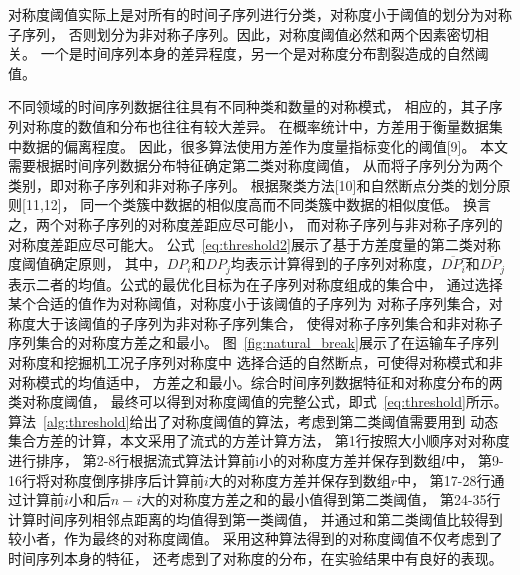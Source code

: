 对称度阈值实际上是对所有的时间子序列进行分类，对称度小于阈值的划分为对称子序列，
否则划分为非对称子序列。因此，对称度阈值必然和两个因素密切相关。
一个是时间序列本身的差异程度，另一个是对称度分布割裂造成的自然阈值。

不同领域的时间序列数据往往具有不同种类和数量的对称模式，
相应的，其子序列对称度的数值和分布也往往有较大差异。
在概率统计中，方差用于衡量数据集中数据的偏离程度。
因此，很多算法使用方差作为度量指标变化的阈值[9]。
本文需要根据时间序列数据分布特征确定第二类对称度阈值，
从而将子序列分为两个类别，即对称子序列和非对称子序列。
根据聚类方法[10]和自然断点分类的划分原则[11,12]，
同一个类簇中数据的相似度高而不同类簇中数据的相似度低。
换言之，两个对称子序列的对称度差距应尽可能小，
而对称子序列与非对称子序列的对称度差距应尽可能大。
公式~\ref{eq:threshold2}展示了基于方差度量的第二类对称度阈值确定原则，
其中，$DP_i$和$DP_j$均表示计算得到的子序列对称度，$\overline{D P_{i}}$̅和$\overline{D P_{j}}$
表示二者的均值。公式的最优化目标为在子序列对称度组成的集合中，
通过选择某个合适的值作为对称阈值，对称度小于该阈值的子序列为
对称子序列集合，对称度大于该阈值的子序列为非对称子序列集合，
使得对称子序列集合和非对称子序列集合的对称度方差之和最小。
图~\ref{fig:natural_break}展示了在运输车子序列对称度和挖掘机工况子序列对称度中
选择合适的自然断点，可使得对称模式和非对称模式的均值适中，
方差之和最小。综合时间序列数据特征和对称度分布的两类对称度阈值，
最终可以得到对称度阈值的完整公式，即式~\ref{eq:threshold}所示。
算法~\ref{alg:threshold}给出了对称度阈值的算法，考虑到第二类阈值需要用到
动态集合方差的计算，本文采用了流式的方差计算方法，
第1行按照大小顺序对对称度进行排序，
第2-8行根据流式算法计算前i小的对称度方差并保存到数组$l$中，
第9-16行将对称度倒序排序后计算前$i$大的对称度方差并保存到数组$r$中，
第17-28行通过计算前$i$小和后$n-i$大的对称度方差之和的最小值得到第二类阈值，
第24-35行计算时间序列相邻点距离的均值得到第一类阈值，
并通过和第二类阈值比较得到较小者，作为最终的对称度阈值。
采用这种算法得到的对称度阈值不仅考虑到了时间序列本身的特征，
还考虑到了对称度的分布，在实验结果中有良好的表现。

\renewcommand{\algorithmicrequire}{\textbf{输入：}\unskip}
\renewcommand{\algorithmicensure}{\textbf{输出：}\unskip}

